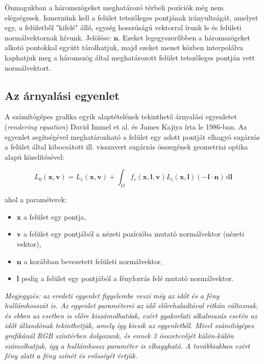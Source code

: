\documentclass[12pt,oneside]{book}
\begin{document}
Önmagukban a háromszögeket meghatározó térbeli pozíciók még nem elégségesek. Ismernünk kell a felület tetszőleges pontjának irányultságát, amelyet egy, a felületből "kifelé" álló, egység hosszúságú vektorral írunk le és felületi normálvektornak hívunk. Jelölése: \(\mathbf{n}\).
Ezeket legegyszerűbben a háromszögeket alkotó pontokkal együtt tárolhatjuk, majd ezeket menet közben interpolálva kaphatjuk meg a háromszög által meghatározott felület tetszőleges pontján vett normálvektort.

\subsection{Az árnyalási egyenlet}

A számítógépes grafika egyik alaptételének tekinthető árnyalási egyenletet (\textit{rendering equation}) David Immel et al. és James Kajiya írta le 1986-ban. Az egyenlet segítségével meghatározható a felület egy adott pontját elhagyó sugárzás a felület által kibocsátott ill. visszavert sugárzás összegének geometriai optika alapú közelítésével:

\[
L_0(\mathbf{x},\mathbf{v}) = L_e(\mathbf{x},\mathbf{v}) + \int_\Omega f_r(\mathbf{x},\mathbf{l},\mathbf{v}) L_i(\mathbf{x},\mathbf{l}) (-\mathbf{l} \cdot \mathbf{n})\,\mathrm{d}\mathbf{l}
\]

\noindent
ahol a paraméterek:

\begin{itemize}[noitemsep]
\item \(\mathbf{x}\) a felület egy pontja,
\item \(\mathbf{v}\) a felület egy pontjából a nézeti pozícióba mutató normálvektor (nézeti vektor),
\item \(\mathbf{n}\) a korábban bevezetett felületi normálvektor,
\item \(\mathbf{l}\) pedig a felület egy pontjából a fényforrás felé mutató normálvektor.
\end{itemize}

\noindent
\textit{Megjegyzés: az eredeti egyenlet figyelembe veszi még az időt és a fény hullámhosszát is. Az egyenlet paraméterei az idő előrehaladtával ritkán változnak, és ebben az esetben is előre kiszámolhatóak, ezért gyakorlati alkalmazás esetén az időt állandónak tekinthetjük, amely így kiesik az egyenletből. Mivel számítógépes grafikánál RGB színtérben dolgozunk, és ennek 3 összetevőjét külön-külön számolhatjuk, így a hullámhossz paraméter is elhagyható. A továbbiakban ezért fény alatt a fény színét és erősségét értjük.}
\end{document}
